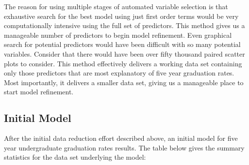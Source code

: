 \documentclass{article}
\begin{document}
The reason for using multiple stages of automated variable selection is that exhaustive search for the best model using just first order terms would be very computationally intensive using the full set of predictors. This method gives us a manageable number of predictors to begin model refinement. Even graphical search for potential predictors would have been difficult with so many potential variables. Consider that there would have been over fifty thousand paired scatter plots to consider. This method effectively delivers a working data set containing only those predictors that are most explanatory of five year graduation rates. Most importantly, it delivers a smaller data set, giving us a manageable place to start model refinement.

\subsection{Initial Model}

After the initial data reduction effort described above, an initial model for five year undergraduate graduation rates results. The table below gives the summary statistics for the data set underlying the model:
\end{document}
